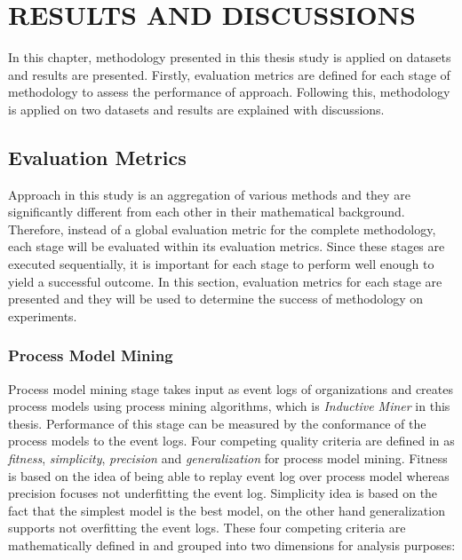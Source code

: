 \chapter{RESULTS AND DISCUSSIONS}
\label{chp:results-and-discussions}

In this chapter, methodology presented in this thesis study is applied on datasets and results are presented. Firstly, evaluation metrics are defined for each stage of methodology to assess the performance of approach. Following this, methodology is applied on two datasets and results are explained with discussions.

\section{Evaluation Metrics}
\label{sec:evaluation-metrics}
Approach in this study is an aggregation of various methods and they are significantly different from each other in their mathematical background. Therefore, instead of a global evaluation metric for the complete methodology, each stage will be evaluated within its evaluation metrics. Since these stages are executed sequentially, it is important for each stage to perform well enough to yield a successful outcome. In this section, evaluation metrics for each stage are presented and they will be used to determine the success of methodology on experiments.

\subsection{Process Model Mining}
\label{subsec:process-model-mining-eval}
Process model mining stage takes input as event logs of organizations and creates process models using process mining algorithms, which is \textit{Inductive Miner} \cite{leemans2014discoveringinfrequent} in this thesis. Performance of this stage can be measured by the conformance of the process models to the event logs. Four competing quality criteria are defined in \cite{van2011process} as \textit{fitness}, \textit{simplicity}, \textit{precision} and \textit{generalization} for process model mining. Fitness is based on the idea of being able to replay event log over process model whereas precision focuses not underfitting the event log. Simplicity idea is based on the fact that the simplest model is the best model, on the other hand generalization supports not overfitting the event logs. These four competing criteria are mathematically defined in \cite{rozinat2008conformance} and grouped into two dimensions for analysis purposes:

